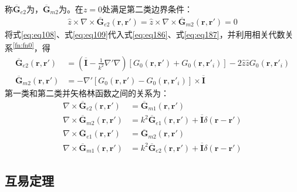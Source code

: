 \documentclass{article}
\numberwithin{equation}{section}
\renewcommand{\vec}[1]{\boldsymbol{#1}}
\begin{document}
称$\overline{\mathbf{G}}_{e2}$为\textbf{\color{blue}{第二类半空间电并矢格林函数}}，$\overline{\mathbf{G}}_{m2}$为\textbf{\color{blue}{第二类半空间磁并矢格林函数}}。在$z=0$处满足第二类边界条件：
\begin{align}
    \label{eq:eq188}
    \hat{z}\times\nabla\times\overline{\mathbf{G}}_{e2}(\vec{r},\vec{r}')=\hat{z}\times\nabla\times\overline{\mathbf{G}}_{m2}(\vec{r},\vec{r}')=0
\end{align}
将式\ref{eq:eq108}、式\ref{eq:eq109}代入式\ref{eq:eq186}、式\ref{eq:eq187}，并利用相关代数关系\textsuperscript{\ref{fn:fn0}}，得
\begin{align}
    \label{eq:eq189}
    \overline{\mathbf{G}}_{e2}(\vec{r},\vec{r}')&=\left(\overline{\mathbf{I}}-\frac{1}{k^2}\nabla'\nabla\right)[G_0(\vec{r},\vec{r}')+G_0(\vec{r},\vec{r}'_i)]-2\hat{z}\hat{z}G_0(\vec{r},\vec{r}'_i) \\
    \label{eq:eq190}
    \overline{\mathbf{G}}_{m2}(\vec{r},\vec{r}')&=-\nabla'[G_0(\vec{r},\vec{r}')-G_0(\vec{r},\vec{r}'_i)]\times\overline{\mathbf{I}}
\end{align}
第一类和第二类并矢格林函数之间的关系为：
\begin{align}
    \label{eq:eq191}
    \nabla\times\overline{\mathbf{G}}_{e2}(\vec{r},\vec{r}')&=\overline{\mathbf{G}}_{m1}(\vec{r},\vec{r}') \\
    \label{eq:eq192}
    \nabla\times\overline{\mathbf{G}}_{m2}(\vec{r},\vec{r}')&=k^2\overline{\mathbf{G}}_{e1}(\vec{r},\vec{r}')+\overline{\mathbf{I}}\delta(\vec{r}-\vec{r}') \\
    \label{eq:eq193}
    \nabla\times\overline{\mathbf{G}}_{e1}(\vec{r},\vec{r}')&=\overline{\mathbf{G}}_{m2}(\vec{r},\vec{r}') \\
    \label{eq:eq194}
    \nabla\times\overline{\mathbf{G}}_{m1}(\vec{r},\vec{r}')&=k^2\overline{\mathbf{G}}_{e2}(\vec{r},\vec{r}')+\overline{\mathbf{I}}\delta(\vec{r}-\vec{r}')
\end{align}
\subsection{互易定理}
\end{document}
